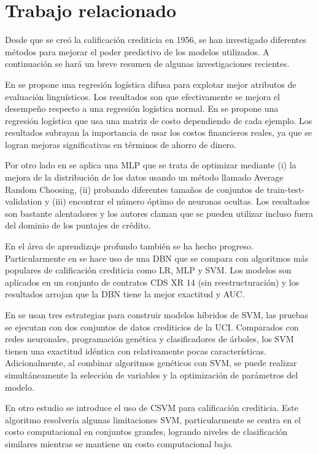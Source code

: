 \section{Trabajo relacionado}

Desde que se creó la calificación crediticia en 1956, se han investigado diferentes métodos para mejorar el poder predictivo de los modelos utilizados. A continuación se hará un breve resumen de algunas investigaciones recientes.

En \citep{sohn2016technology} se propone una regresión logística difusa para explotar mejor atributos de evaluación linguísticos. Los resultados son que efectivamente se mejora el desempeño respecto a una regresión logística normal. En \citep{bahnsen2014example} se propone una regresión logística que usa una matriz de costo dependiendo de cada ejemplo. Los resultados subrayan la importancia de usar los costos financieros reales, ya que se logran mejoras significativas en términos de ahorro de dinero.

Por otro lado en \citep{zhao2015investigation} se aplica una \ac{MLP} que se trata de optimizar mediante (i) la mejora de la distribución de los datos usando un método llamado Average Random Choosing, (ii) probando diferentes tamaños de conjuntos de train-test-validation y (iii) encontrar el número óptimo de neuronas ocultas. Los resultados son bastante alentadores y los autores claman que se pueden utilizar incluso fuera del dominio de los puntajes de crédito.

En el área de aprendizaje profundo también se ha hecho progreso. Particularmente en \citep{luo2017deep} se hace uso de una \ac{DBN} que se compara con algoritmos más populares de calificación crediticia como \ac{LR}, \ac{MLP} y \ac{SVM}. Los modelos son aplicados en un conjunto de contratos CDS XR 14 (sin reestructuración) y los resultados arrojan que la \ac{DBN} tiene la mejor exactitud y AUC.

En \citep{huang2007credit} se usan tres estrategias para construir modelos híbridos de \ac{SVM}, las pruebas se ejecutan con dos conjuntos de datos crediticios de la UCI. Comparados con redes neuronales, programación genética y clasificadores de árboles, los \ac{SVM} tienen una exactitud idéntica con relativamente pocas características. Adicionalmente, al combinar algoritmos genéticos con \ac{SVM}, se puede realizar simultáneamente la selección de variables y la optimización de parámetros del modelo.

En otro estudio \citep{harris2015credit} se introduce el uso de \ac{CSVM} para calificación crediticia. Este algoritmo resolvería algunas limitaciones \ac{SVM}, particularmente se centra en el costo computacional en conjuntos grandes, logrando niveles de clasificación similares mientras se mantiene un costo computacional bajo.

